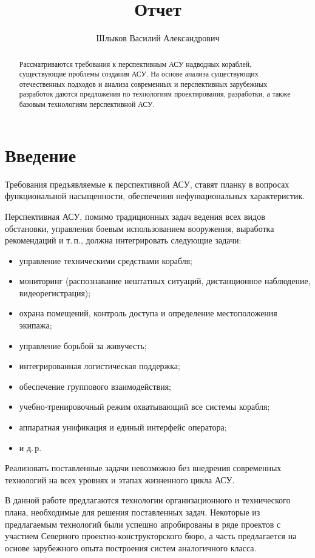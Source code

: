 \documentclass[paper=a4, fontsize=12pt, titlepage=false, twoside=false]{scrartcl}
\title{Отчет}
\author{Шлыков Василий Александрович}
\date{}
\begin{document}
\begin{abstract}
Рассматриваются требования к перспективным АСУ надводных кораблей,
существующие проблемы создания АСУ. На основе анализа существующих
отечественных подходов и анализа современных и перспективных
зарубежных разработок даются предложения по технологиям проектирования,
разработки, а также базовым технологиям перспективной АСУ.
\end{abstract}

\pagebreak

\section{Введение}

Требования предъявляемые к перспективной АСУ, ставят планку в вопросах
функциональной насыщенности, обеспечения нефункциональных характеристик.

Перспективная АСУ, помимо традиционных задач ведения всех видов обстановки,
управления боевым использованием вооружения, выработка рекомендаций и т.\,п.,
должна интегрировать следующие задачи:
\begin{itemize}
  \item управление техническими средствами корабля;
  \item мониторинг (распознавание нештатных ситуаций, дистанционное наблюдение,
        видеорегистрация);
  \item охрана помещений, контроль доступа и определение местоположения экипажа;
  \item управление борьбой за живучесть;
  \item интегрированная логистическая поддержка;
  \item обеспечение группового взаимодействия;
  \item учебно-тренировочный режим охватывающий все системы корабля;
  \item аппаратная унификация и единый интерфейс оператора;
  \item и д.\,р.
\end{itemize}

Реализовать поставленные задачи невозможно без внедрения современных технологий
на всех уровнях и этапах жизненного цикла АСУ.

В данной работе предлагаются технологии организационного и технического плана,
необходимые для решения поставленных задач. Некоторые из предлагаемым технологий
были успешно апробированы в ряде проектов с участием
Северного проектно-конструкторского бюро, а часть предлагается на основе зарубежного
опыта построения систем аналогичного класса.
\end{document}
